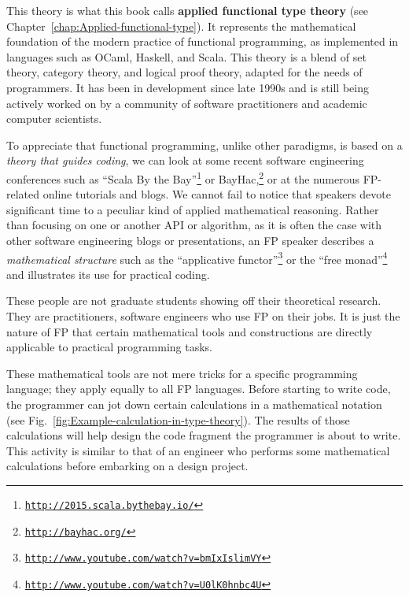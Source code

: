 This theory is what this book calls \textbf{applied functional type
theory} (see Chapter~\ref{chap:Applied-functional-type}).
It represents the mathematical foundation of the modern practice of
functional programming, as implemented in languages such as OCaml,
Haskell, and Scala. This theory is a blend of set theory, category
theory, and logical proof theory, adapted for the needs of programmers.
It has been in development since late 1990s and is still being actively
worked on by a community of software practitioners and academic computer
scientists.

To appreciate that functional programming, unlike other paradigms,
is based on a \emph{theory that guides coding}, we can look at some
recent software engineering conferences such as \textsf{``}Scala By the Bay\textsf{''}\footnote{\texttt{\href{http://2015.scala.bythebay.io/}{http://2015.scala.bythebay.io/}}}
or BayHac,\footnote{\texttt{\href{http://bayhac.org/}{http://bayhac.org/}}}
or at the numerous FP-related online tutorials and blogs. We cannot
fail to notice that speakers devote significant time to a peculiar
kind of applied mathematical reasoning. Rather than focusing on one
or another API or algorithm, as it is often the case with other software
engineering blogs or presentations, an FP speaker describes a \emph{mathematical
structure} \textemdash{} such as the \textsf{``}applicative functor\textsf{''}\footnote{\texttt{\href{http://www.youtube.com/watch?v=bmIxIslimVY}{http://www.youtube.com/watch?v=bmIxIslimVY}}}
or the \textsf{``}free monad\textsf{''}\footnote{\texttt{\href{http://www.youtube.com/watch?v=U0lK0hnbc4U}{http://www.youtube.com/watch?v=U0lK0hnbc4U}}}
\textemdash{} and illustrates its use for practical coding.

These people are not graduate students showing off their theoretical
research. They are practitioners, software engineers who use FP on
their jobs. It is just the nature of FP that certain mathematical
tools and constructions are directly applicable to practical programming
tasks.

These mathematical tools are not mere tricks for a specific programming
language; they apply equally to all FP languages. Before starting
to write code, the programmer can jot down certain calculations in
a mathematical notation (see Fig.\ \ref{fig:Example-calculation-in-type-theory}).
The results of those calculations will help design the code fragment
the programmer is about to write. This activity is similar to that
of an engineer who performs some mathematical calculations before
embarking on a design project. 

